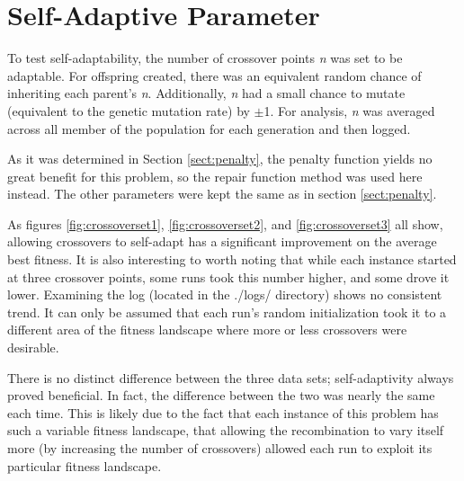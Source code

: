 \documentclass[11pt]{article}
\begin{document}
\section{Self-Adaptive Parameter}\label{sect:selfadaptive}

To test self-adaptability, the number of crossover points \textit{n} was set to be adaptable. For offspring created, there was an equivalent random chance of inheriting each parent's \textit{n}. Additionally, \textit{n} had a small chance to mutate (equivalent to the genetic mutation rate) by $\pm$1. For analysis, \textit{n} was averaged across all member of the population for each generation and then logged.

As it was determined in Section \ref{sect:penalty}, the penalty function yields no great benefit for this problem, so the repair function method was used here instead. The other parameters were kept the same as in section \ref{sect:penalty}.

As figures \ref{fig:crossoverset1}, \ref{fig:crossoverset2}, and \ref{fig:crossoverset3} all show, allowing crossovers to self-adapt has a significant improvement on the average best fitness. It is also interesting to worth noting that while each instance started at three crossover points, some runs took this number higher, and some drove it lower. Examining the log (located in the ./logs/ directory) shows no consistent trend. It can only be assumed that each run's random initialization took it to a different area of the fitness landscape where more or less crossovers were desirable.

There is no distinct difference between the three data sets; self-adaptivity always proved beneficial. In fact, the difference between the two was nearly the same each time. This is likely due to the fact that each instance of this problem has such a variable fitness landscape, that allowing the recombination to vary itself more (by increasing the number of crossovers) allowed each run to exploit its particular fitness landscape.
\end{document}
